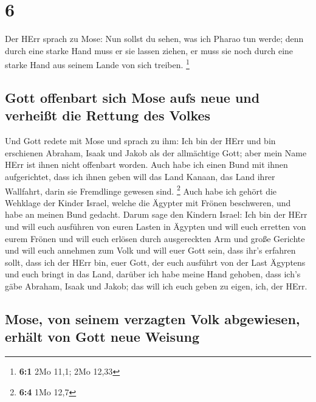 \hypertarget{section-5}{%
\section{6}\label{section-5}}

 Der HErr sprach zu Mose: Nun sollst du sehen, was ich
Pharao tun werde; denn durch eine starke Hand muss er sie lassen ziehen,
er muss sie noch durch eine starke Hand aus seinem Lande von sich
treiben. \footnote{\textbf{6:1} 2Mo 11,1; 2Mo 12,33}

\hypertarget{gott-offenbart-sich-mose-aufs-neue-und-verheiuxdft-die-rettung-des-volkes}{%
\subsection{Gott offenbart sich Mose aufs neue und verheißt die Rettung
des
Volkes}\label{gott-offenbart-sich-mose-aufs-neue-und-verheiuxdft-die-rettung-des-volkes}}

 Und Gott redete mit Mose und sprach zu ihm: Ich bin der
HErr  und bin erschienen Abraham, Isaak und Jakob als der
allmächtige Gott; aber mein Name HErr ist ihnen nicht offenbart worden.
 Auch habe ich einen Bund mit ihnen aufgerichtet, dass ich
ihnen geben will das Land Kanaan, das Land ihrer Wallfahrt, darin sie
Fremdlinge gewesen sind. \footnote{\textbf{6:4} 1Mo 12,7} 
Auch habe ich gehört die Wehklage der Kinder Israel, welche die Ägypter
mit Frönen beschweren, und habe an meinen Bund gedacht. 
Darum sage den Kindern Israel: Ich bin der HErr und will euch ausführen
von euren Lasten in Ägypten und will euch erretten von eurem Frönen und
will euch erlösen durch ausgereckten Arm und große Gerichte
 und will euch annehmen zum Volk und will euer Gott sein,
dass ihr's erfahren sollt, dass ich der HErr bin, euer Gott, der euch
ausführt von der Last Ägyptens  und euch bringt in das
Land, darüber ich habe meine Hand gehoben, dass ich's gäbe Abraham,
Isaak und Jakob; das will ich euch geben zu eigen, ich, der HErr.

\hypertarget{mose-von-seinem-verzagten-volk-abgewiesen-erhuxe4lt-von-gott-neue-weisung}{%
\subsection{Mose, von seinem verzagten Volk abgewiesen, erhält von Gott
neue
Weisung}\label{mose-von-seinem-verzagten-volk-abgewiesen-erhuxe4lt-von-gott-neue-weisung}}

